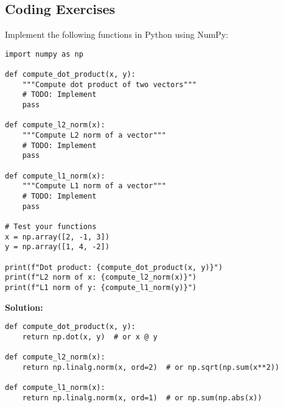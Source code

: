 \documentclass{article}
\newcounter{coding}
\begin{document}
\subsection{Coding Exercises}

\begin{tcolorbox}[colback=cyan!5!white,colframe=cyan!75!black,title=Coding Problem \stepcounter{coding}\#\thecoding: Vector Operations in Python]
Implement the following functions in Python using NumPy:

\begin{verbatim}
import numpy as np

def compute_dot_product(x, y):
    """Compute dot product of two vectors"""
    # TODO: Implement
    pass

def compute_l2_norm(x):
    """Compute L2 norm of a vector"""
    # TODO: Implement  
    pass

def compute_l1_norm(x):
    """Compute L1 norm of a vector"""
    # TODO: Implement
    pass

# Test your functions
x = np.array([2, -1, 3])
y = np.array([1, 4, -2])

print(f"Dot product: {compute_dot_product(x, y)}")
print(f"L2 norm of x: {compute_l2_norm(x)}")
print(f"L1 norm of y: {compute_l1_norm(y)}")
\end{verbatim}

\textbf{Solution:}
\begin{verbatim}
def compute_dot_product(x, y):
    return np.dot(x, y)  # or x @ y

def compute_l2_norm(x):
    return np.linalg.norm(x, ord=2)  # or np.sqrt(np.sum(x**2))

def compute_l1_norm(x):
    return np.linalg.norm(x, ord=1)  # or np.sum(np.abs(x))
\end{verbatim}
\end{tcolorbox}
\end{document}
